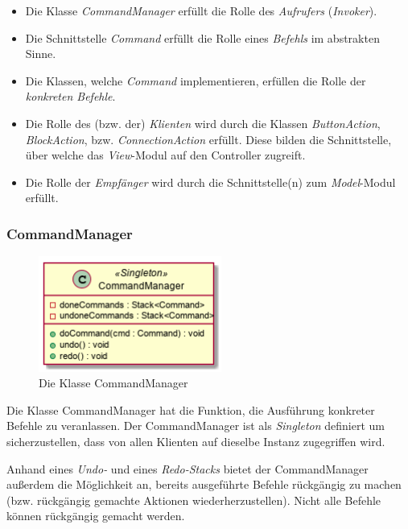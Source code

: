 \documentclass[parskip=full]{scrartcl}
\begin{document}
\begin{itemize}

\item Die Klasse \textit{CommandManager} erfüllt die Rolle des \textit{Aufrufers} (\textit{Invoker}).
\item Die Schnittstelle \textit{Command} erfüllt die Rolle eines \textit{Befehls} im abstrakten Sinne.
\item Die Klassen, welche \textit{Command} implementieren, erfüllen die Rolle der \textit{konkreten Befehle}.
\item Die Rolle des (bzw. der) \textit{Klienten} wird durch die Klassen \textit{ButtonAction}, \textit{BlockAction}, bzw. \textit{ConnectionAction} erfüllt. Diese bilden die Schnittstelle, über welche das \textit{View}-Modul auf den Controller zugreift.
\item Die Rolle der \textit{Empfänger} wird durch die Schnittstelle(n) zum \textit{Model}-Modul erfüllt.

\end{itemize}

\subsubsection{CommandManager}

\begin{figure}[htbp]
	\begin{center}
		\includegraphics[width = 6cm]{Grafiken/CommandManager.png}
		\caption{Die Klasse CommandManager}
		\label{CommandManager}
	\end{center}
\end{figure}

Die Klasse CommandManager hat die Funktion, die Ausführung konkreter Befehle zu veranlassen. Der CommandManager ist als \textit{Singleton} definiert um sicherzustellen, dass von allen Klienten auf dieselbe Instanz zugegriffen wird.

Anhand eines \textit{Undo-} und eines \textit{Redo-Stacks} bietet der CommandManager außerdem die Möglichkeit an, bereits ausgeführte Befehle rückgängig zu machen (bzw. rückgängig gemachte Aktionen wiederherzustellen). Nicht alle Befehle können rückgängig gemacht werden.
\end{document}
